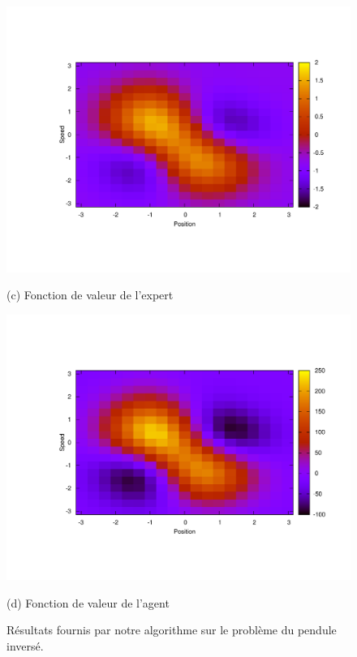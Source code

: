 \documentclass[publibook-draft]{CAp2012}
\begin{document}
\begin{figure}[tb]
\begin{minipage}[b]{.5\linewidth}
  \centerline{\includegraphics[width=1.2\linewidth]{LAFEM_Exp3_Vexpert.pdf}}
  \centerline{(c) Fonction de valeur de l'expert}%
\end{minipage}
\hfill
\begin{minipage}[b]{.5\linewidth}
  \centering
  \centerline{\includegraphics[width=1.2\linewidth]{LAFEM_Exp3_Vagent.pdf}}
  \centerline{(d) Fonction de valeur de l'agent}%
\end{minipage}
%
\caption{Résultats fournis par notre algorithme sur le problème du pendule inversé.}
\label{onlyFig.fig}
%
\vspace{-5pt}
\end{figure}
\end{document}
